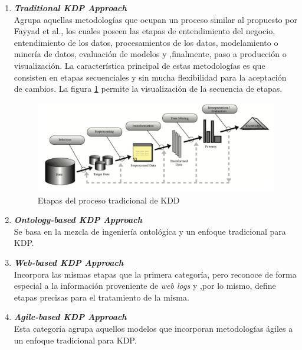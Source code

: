 \begin{enumerate}
  \item \textbf{\textit{Traditional KDP Approach}}\mbox{}\\ Agrupa aquellas metodologías que ocupan un proceso similar al propuesto por Fayyad et al., los cuales poseen las etapas de entendimiento del negocio, entendimiento de los datos, procesamientos de los datos, modelamiento o minería de datos, evaluación de modelos y ,finalmente, paso a producción o visualización. La característica principal de estas metodologías es que consisten en etapas secuenciales y sin mucha flexibilidad para la aceptación de cambios. La figura \ref{fig:traditional_kdd_structure} permite la visualización de la secuencia de etapas.

  \begin{figure}[ht]
    \begin{center}
    \includegraphics[width=1\textwidth]{./figures/chapter_02/13_kdd_process_model.png}
    \caption{Etapas del proceso tradicional de KDD}
    \label{fig:traditional_kdd_structure}
    \end{center}
  \end{figure}

  \item \textbf{\textit{Ontology-based KDP Approach}}\mbox{}\\ Se basa en la mezcla de ingeniería ontológica  y un enfoque tradicional para KDP.
  \item \textbf{\textit{Web-based KDP Approach}} \mbox{} \\ Incorpora las mismas etapas que la primera categoría, pero reconoce de forma especial a la información proveniente de \textit{web logs} y ,por lo mismo, define etapas precisas para el tratamiento de la misma.
  \item \textbf{\textit{Agile-based KDP Approach}} \mbox{} \\  Esta categoría agrupa aquellos modelos que incorporan metodologías ágiles a un enfoque tradicional para KDP.
\end{enumerate}

